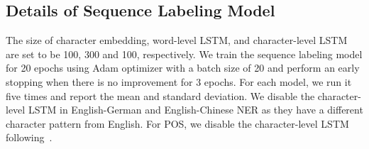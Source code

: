 \documentclass[11pt,a4paper]{article}
\begin{document}
	\subsection{Details of Sequence Labeling Model} 
	The size of character embedding, word-level LSTM, and character-level LSTM are set to be 100, 300 and 100, respectively. We train the sequence labeling model for 20 epochs using Adam optimizer with a batch size of 20 and perform an early stopping when there is no improvement for 3 epochs. For each model, we run it five times and report the mean and standard deviation. We disable the character-level LSTM in English-German and English-Chinese NER as they have a different character pattern from English. For POS, we disable the character-level LSTM following~\cite{fang2017model}.
	
	
	
\end{document}
